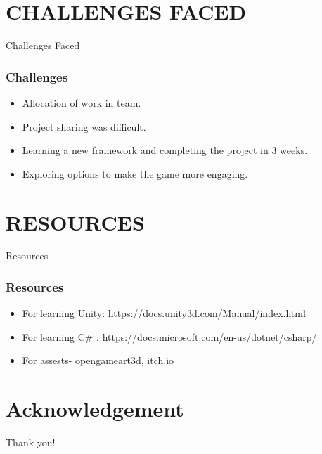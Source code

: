 \documentclass[10pt]{beamer}
\begin{document}
\section{CHALLENGES FACED}
    \begin{frame}{Challenges Faced}
    \frametitle{Challenges}
        \begin{itemize}
            \item Allocation of work in team. 
            \item Project sharing was difficult.
            \item Learning a new framework and completing the project in 3 weeks.
            \item Exploring options to make the game more engaging.
            
        \end{itemize}
    \end{frame}

\section{RESOURCES}
    \begin{frame}{Resources}
    \frametitle{Resources}
        \begin{itemize}
            \item For learning Unity: https://docs.unity3d.com/Manual/index.html 
            \item For learning C\# : https://docs.microsoft.com/en-us/dotnet/csharp/
            \item For assests- opengameart3d, itch.io
            
        \end{itemize}
 \end{frame}




\section*{Acknowledgement}  
\begin{frame}
\textcolor{myNewColorA}{\Huge{\centerline{Thank you!}}}
\end{frame}
\end{document}
